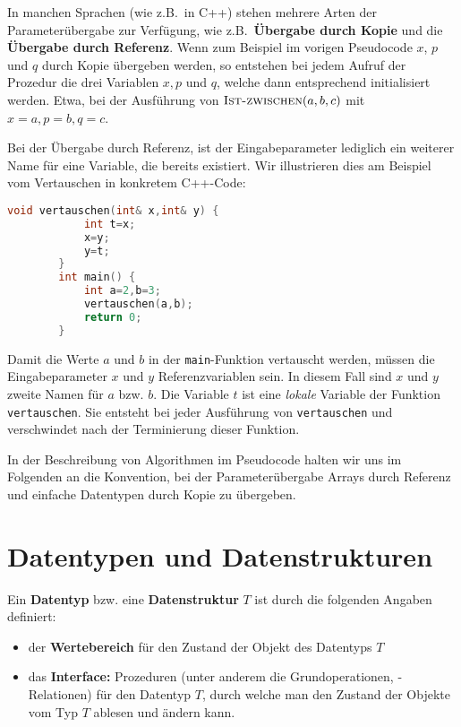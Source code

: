 \begin{bem} 
In manchen Sprachen (wie z.B.~in C++) stehen mehrere Arten der Parameterübergabe zur Verfügung, wie z.B.~\textbf{Übergabe durch Kopie} und die \textbf{Übergabe durch Referenz}. Wenn zum Beispiel im vorigen Pseudocode $x$, $p$ und $q$ durch Kopie übergeben werden, so entstehen bei jedem Aufruf der Prozedur die drei Variablen $x, p$ und $q$, welche dann entsprechend initialisiert werden. Etwa, bei der Ausführung von $\mathop{\text{\textsc{Ist-zwischen}}}(a,b,c)$ mit $x=a, p=b, q=c$. 
\end{bem} 

\begin{bsp} 
Bei der Übergabe durch Referenz, ist der Eingabeparameter lediglich ein weiterer Name für eine Variable, die bereits existiert. Wir illustrieren dies am Beispiel vom Vertauschen in konkretem C++-Code: 

\begin{center}
	\small 
	\begin{lstlisting}[language=C++]
		void vertauschen(int& x,int& y) {
			int t=x;
			x=y;
			y=t;
		}
		int main() {
			int a=2,b=3;
			vertauschen(a,b);
			return 0;
		}
	\end{lstlisting}
\end{center}

Damit die Werte $a$ und $b$ in der \texttt{main}-Funktion vertauscht werden, müssen die Eingabeparameter $x$ und $y$ Referenzvariablen sein. In diesem Fall sind $x$ und $y$ zweite Namen für $a$ bzw. $b$. Die Variable $t$ ist eine \emph{lokale} Variable der Funktion \texttt{vertauschen}. Sie entsteht bei jeder Ausführung von \texttt{vertauschen} und verschwindet nach der Terminierung dieser Funktion. 
\end{bsp} 

\begin{bem}
	In der Beschreibung von Algorithmen im Pseudocode halten wir uns im Folgenden an die Konvention, bei der Parameterübergabe Arrays durch Referenz und einfache Datentypen durch Kopie zu übergeben.
\end{bem}


\section{Datentypen und Datenstrukturen}
\label{sect:datenstrukturen}

\begin{defn}
	Ein \textbf{Datentyp} bzw. eine \textbf{Datenstruktur} $T$ ist durch die folgenden Angaben definiert: 
	\begin{itemize} 
		\item[] der \textbf{Wertebereich} für den Zustand der Objekt des Datentyps $T$
		\item[] das \textbf{Interface:} Prozeduren (unter anderem die Grundoperationen, -Relationen) für den Datentyp $T$, durch welche man den Zustand der Objekte vom Typ $T$ ablesen und ändern kann. 
	\end{itemize}  
\end{defn} 

